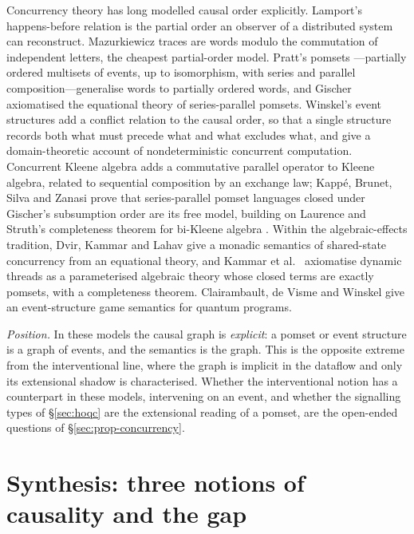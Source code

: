 Concurrency theory has long modelled causal order explicitly. Lamport's happens-before relation \cite{lamport1978time} is the partial order an observer of a distributed system can reconstruct. Mazurkiewicz traces \cite{diekert1995traces} are words modulo the commutation of independent letters, the cheapest partial-order model. Pratt's pomsets \cite{pratt1986pomsets}---partially ordered multisets of events, up to isomorphism, with series and parallel composition---generalise words to partially ordered words, and Gischer \cite{gischer1988pomsets} axiomatised the equational theory of series-parallel pomsets. Winskel's event structures \cite{winskel1986eventstructures,nielsen1981petri,winskel1995models} add a conflict relation to the causal order, so that a single structure records both what must precede what and what excludes what, and give a domain-theoretic account of nondeterministic concurrent computation. Concurrent Kleene algebra \cite{hoare2011cka} adds a commutative parallel operator to Kleene algebra, related to sequential composition by an exchange law; Kappé, Brunet, Silva and Zanasi \cite{kappe2018cka} prove that series-parallel pomset languages closed under Gischer's subsumption order are its free model, building on Laurence and Struth's completeness theorem for bi-Kleene algebra \cite{laurence2014completeness}. Within the algebraic-effects tradition, Dvir, Kammar and Lahav \cite{dvir2022sharedstate} give a monadic semantics of shared-state concurrency from an equational theory, and Kammar et al.\ \cite{kammar2026threads} axiomatise dynamic threads as a parameterised algebraic theory whose closed terms are exactly pomsets, with a completeness theorem. Clairambault, de Visme and Winskel \cite{clairambault2019quantumgames} give an event-structure game semantics for quantum programs.

\emph{Position.} In these models the causal graph is \emph{explicit}: a pomset or event structure is a graph of events, and the semantics is the graph. This is the opposite extreme from the interventional line, where the graph is implicit in the dataflow and only its extensional shadow is characterised. Whether the interventional notion has a counterpart in these models, intervening on an event, and whether the signalling types of \S\ref{sec:hoqc} are the extensional reading of a pomset, are the open-ended questions of \S\ref{sec:prop-concurrency}.

\section{Synthesis: three notions of causality and the gap}\label{sec:synthesis}

